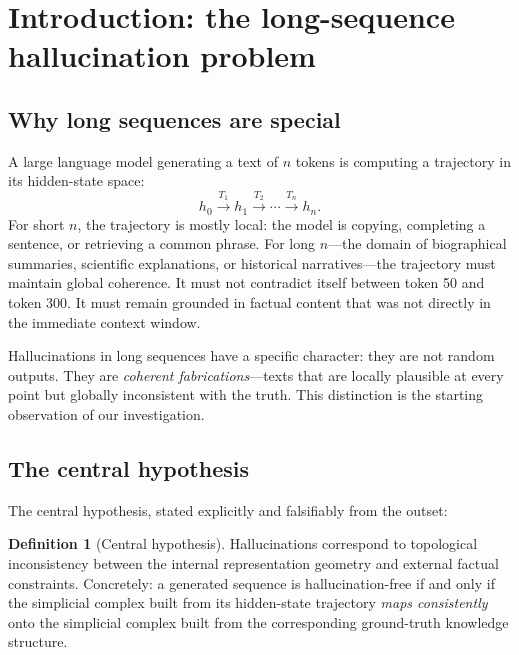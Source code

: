 \documentclass[11pt]{amsart}
\theoremstyle{definition}
\newtheorem{definition}[theorem]{Definition}
\begin{document}
\tableofcontents

\section{Introduction: the long-sequence hallucination problem}

\subsection{Why long sequences are special}

A large language model generating a text of $n$ tokens is computing
a trajectory in its hidden-state space:
\[
  h_0 \xrightarrow{T_1} h_1 \xrightarrow{T_2} \cdots \xrightarrow{T_n} h_n.
\]
For short $n$, the trajectory is mostly local: the model is copying,
completing a sentence, or retrieving a common phrase.
For long $n$---the domain of biographical summaries, scientific explanations,
or historical narratives---the trajectory must maintain global coherence.
It must not contradict itself between token 50 and token 300.
It must remain grounded in factual content that was not directly in the
immediate context window.

Hallucinations in long sequences have a specific character: they are not
random outputs.
They are \emph{coherent fabrications}---texts that are locally plausible
at every point but globally inconsistent with the truth.
This distinction is the starting observation of our investigation.

\subsection{The central hypothesis}

The central hypothesis, stated explicitly and falsifiably from the outset:

\begin{definition}[Central hypothesis]
\label{def:central-hyp}
Hallucinations correspond to topological inconsistency between
the internal representation geometry and external factual constraints.
Concretely: a generated sequence is hallucination-free if and only if
the simplicial complex built from its hidden-state trajectory
\emph{maps consistently} onto the simplicial complex built from the
corresponding ground-truth knowledge structure.
\end{definition}
\end{document}
